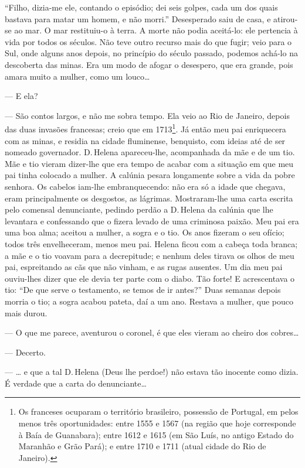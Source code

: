 ``Filho, dizia-me ele, contando o episódio; dei seis golpes, cada um dos
quais bastava para matar um homem, e não morri.'' Desesperado saiu de
casa, e atirou-se ao mar. O mar restituiu-o à terra. A morte não podia
aceitá-lo: ele pertencia à vida por todos os séculos. Não teve outro
recurso mais do que fugir; veio para o Sul, onde alguns anos depois, no
princípio do século passado, podemos achá-lo na descoberta das minas.
Era um modo de afogar o desespero, que era grande, pois amara muito a
mulher, como um louco\ldots{}

--- E ela?

--- São contos largos, e não me sobra tempo. Ela veio ao Rio de Janeiro,
depois das duas invasões francesas; creio que em 1713\footnote{Os
  franceses ocuparam o território brasileiro, possessão de Portugal, em
  pelos menos três oportunidades: entre 1555 e 1567 (na região que hoje
  corresponde à Baía de Guanabara); entre 1612 e 1615 (em São Luís, no
  antigo Estado do Maranhão e Grão Pará); e entre 1710 e 1711 (atual
  cidade do Rio de Janeiro).}. Já então meu pai enriquecera com as
minas, e residia na cidade fluminense, benquisto, com ideias até de ser
nomeado governador. D.\,Helena apareceu-lhe, acompanhada da mãe e de um
tio. Mãe e tio vieram dizer-lhe que era tempo de acabar com a situação
em que meu pai tinha colocado a mulher. A calúnia pesara longamente
sobre a vida da pobre senhora. Os cabelos iam-lhe embranquecendo: não
era só a idade que chegava, eram principalmente os desgostos, as
lágrimas. Mostraram-lhe uma carta escrita pelo comensal denunciante,
pedindo perdão a D.\,Helena da calúnia que lhe levantara e confessando
que o fizera levado de uma criminosa paixão. Meu pai era uma boa alma;
aceitou a mulher, a sogra e o tio. Os anos fizeram o seu ofício; todos
três envelheceram, menos meu pai. Helena ficou com a cabeça toda branca;
a mãe e o tio voavam para a decrepitude; e nenhum deles tirava os olhos
de meu pai, espreitando as cãs que não vinham, e as rugas ausentes. Um
dia meu pai ouviu-lhes dizer que ele devia ter parte com o diabo. Tão
forte! E acrescentava o tio: ``De que serve o testamento, se temos de ir
antes?'' Duas semanas depois morria o tio; a sogra acabou pateta, daí a
um ano. Restava a mulher, que pouco mais durou.

--- O que me parece, aventurou o coronel, é que eles vieram ao cheiro
dos cobres\ldots{}

--- Decerto.

--- \ldots{} e que a tal D.\,Helena (Deus lhe perdoe!) não estava tão inocente
como dizia. É verdade que a carta do denunciante\ldots{}

